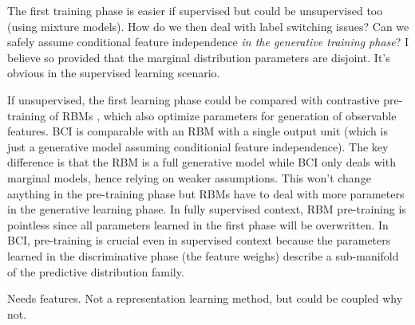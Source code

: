 \documentclass[english]{scrartcl}
\begin{document}
The first training phase is easier if supervised but could be unsupervised too (using mixture models). How do we then deal with label switching issues? Can we safely assume conditional feature independence {\em in the generative training phase}? I believe so provided that the marginal distribution parameters are disjoint. It's obvious in the supervised learning scenario.

If unsupervised, the first learning phase could be compared with contrastive pre-training of RBMs \cite{Hinton-06,Fischer-14}, which also optimize parameters for generation of observable features. BCI is comparable with an RBM with a single output unit (which is just a generative model assuming conditionial feature independence). The key difference is that the RBM is a full generative model while BCI only deals with marginal models, hence relying on weaker assumptions. This won't change anything in the pre-training phase but RBMs have to deal with more parameters in the generative learning phase. In fully supervised context, RBM pre-training is pointless since all parameters learned in the first phase will be overwritten. In BCI, pre-training is crucial even in supervised context because the parameters learned in the discriminative phase (the feature weighs) describe a sub-manifold of the predictive distribution family.

Needs features. Not a representation learning method, but could be coupled why not.





\end{document}
